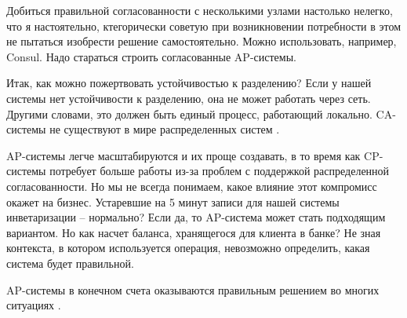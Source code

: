 \documentclass[%
	11pt,
	a4paper,
	utf8,
		]{article}
\begin{document}
Добиться правильной согласованности с несколькими узлами настолько нелегко, что я настоятельно, ктегорически советую при возникновении потребности в этом не пытаться изобрести решение самостоятельно. Можно использовать, например, Consul. Надо стараться строить согласованные AP-системы.

Итак, как можно пожертвовать устойчивостью к разделению? Если у нашей системы нет устойчивости к разделению, она не может работать через сеть. Другими словами, это должен быть единый процесс, работающий локально. {\color{red}CA-системы не существуют в мире распределенных систем} \cite[]{microservices-2024}.

AP-системы легче масштабируются и их проще создавать, в то время как CP-системы потребует больше работы из-за проблем с поддержкой распределенной согласованности. Но мы не всегда понимаем, какое влияние этот компромисс окажет на бизнес. Устаревшие на 5 минут записи для нашей системы инветаризации -- нормально? Если да, то AP-система может стать подходящим вариантом. Но как насчет баланса, хранящегося для клиента в банке? Не зная контекста, в котором используется операция, невозможно определить, какая система будет правильной.

AP-системы в конечном счета оказываются правильным решением во многих ситуациях \cite[]{microservices-2024}.






\begin{thebibliography}{99}
	
	
\end{thebibliography}


\end{document}
